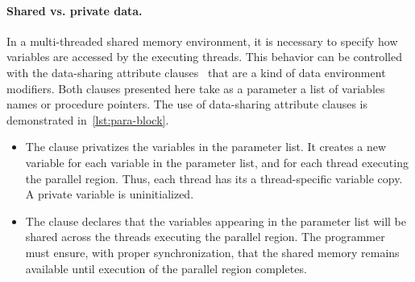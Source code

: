 \paragraph*{Shared vs. private data.}
In a multi-threaded shared memory environment, it is necessary to specify how variables are accessed by the executing threads.
This behavior can be controlled with the data-sharing attribute clauses~\cite[p. 224--225]{openmp_api} that are a kind of data environment modifiers.
Both clauses presented here take as a parameter a list of variables names or procedure pointers.
The use of data-sharing attribute clauses is demonstrated in~\autoref{lst:para-block}.

\begin{itemize}

\item The  clause privatizes the variables in the parameter list.
It creates a new variable for each variable in the parameter list, and for each thread executing the parallel region.
Thus, each thread has its a thread-specific variable copy.
A private variable is uninitialized.

\item The  clause declares that the variables appearing in the parameter list will be shared across the threads executing the parallel region.
The programmer must ensure, with proper synchronization, that the shared memory remains available until execution of the parallel region completes.

\end{itemize}

